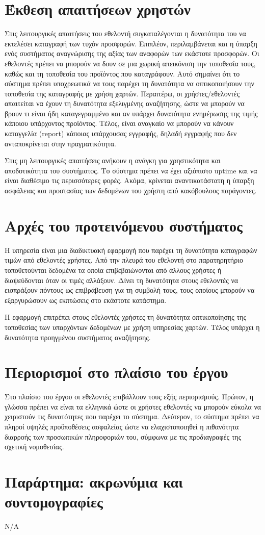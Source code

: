 \documentclass[a4paper,oneside, 12pt]{article}
\begin{document}
\section{Έκθεση απαιτήσεων χρηστών}
Στις λειτουργικές απαιτήσεις του εθελοντή συγκαταλέγονται η δυνατότητα του να εκτελέσει καταγραφή των τυχόν προσφορών. Επιπλέον, περιλαμβάνεται και η ύπαρξη ενός συστήματος αναγνώρισης της αξίας των αναφορών των εκάστοτε προσφορών. Οι εθελοντές πρέπει να μπορούν να δουν σε μια χωρική απεικόνιση την τοποθεσία τους, καθώς και τη τοποθεσία του προϊόντος που καταγράφουν. Αυτό σημαίνει ότι το σύστημα πρέπει υποχρεωτικά να τους παρέχει τη δυνατότητα να οπτικοποιήσουν την τοποθεσία της καταγραφής με χρήση χαρτών. Περαιτέρω, οι χρήστες/εθελοντές απαιτείται να έχουν τη δυνατότητα εξελιγμένης αναζήτησης, ώστε να μπορούν να βρουν τι είναι ήδη καταγεγραμμένο και αν υπάρχει δυνατότητα ενημέρωσης της τιμής κάποιου υπάρχοντος προϊόντος. Τέλος, είναι αναγκαίο να μπορούν να κάνουν καταγγελία (report) κάποιας υπάρχουσας εγγραφής, δηλαδή εγγραφής που δεν ανταποκρίνεται στην πραγματικότητα.

Στις μη λειτουργικές απαιτήσεις ανήκουν η ανάγκη για χρηστικότητα και αποδοτικότητα του συστήματος. Το σύστημα πρέπει να έχει αξιόπιστο uptime και να είναι διαθέσιμο τις περισσότερες φορές. Ακόμα, κρίνεται αναντικατάστατη η ύπαρξη ασφάλειας και προστασίας των δεδομένων του χρήστη από κακόβουλους παράγοντες.   

\section{Αρχές του προτεινόμενου συστήματος}

Η υπηρεσία είναι μια διαδικτυακή εφαρμογή που παρέχει τη δυνατότητα καταγραφών τιμών από εθελοντές χρήστες. Από την πλευρά του εθελοντή στο παρατηρητήριο  τοποθετούνται δεδομένα τα οποία επιβεβαιώνονται από άλλους χρήστες ή διαψεύδονται όταν οι τιμές αλλάξουν. Δίνει τη δυνατότητα στους εθελοντές να εισπράξουν πόντους ως επιβράβευση για τη συμβολή τους, τους οποίους μπορούν να εξαργυρώσουν ως εκπτώσεις στο εκάστοτε κατάστημα. 

Η εφαρμογή επιτρέπει στους εθελοντές-χρήστες τη δυνατότητα οπτικοποίησης της τοποθεσίας των υπαρχόντων δεδομένων με χρήση υπηρεσίας χαρτών. Τέλος υπάρχει η δυνατότητα προηγμένου συστήματος αναζήτησης.

\section{Περιορισμοί στο πλαίσιο του έργου}

Στο πλαίσιο του έργου οι εθελοντές επιβάλλουν τους εξής περιορισμούς. Πρώτον, η γλώσσα πρέπει να είναι τα ελληνικά ώστε οι χρήστες εθελοντές να μπορούν εύκολα να χειριστούν τις δυνατότητες που παρέχει το σύστημα. Δεύτερον, το σύστημα πρέπει να πληροί υψηλές προϋποθέσεις ασφαλείας ώστε να ελαχιστοποιηθεί η πιθανότητα διαρροής των προσωπικών πληροφοριών του, σύμφωνα με τις προδιαγραφές της σχετική νομοθεσίας.

\section{Παράρτημα: ακρωνύμια και συντομογραφίες}

Ν/Α
\end{document}
